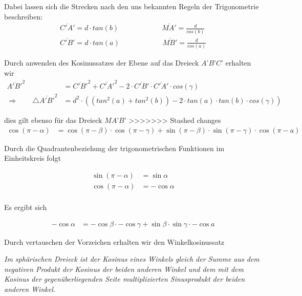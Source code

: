 \begin{refsection}
\begin{refsection}
Dabei lassen sich die Strecken nach den uns bekannten Regeln der Trigonometrie beschreiben:
\begin{align*}
\overline{C'A'} = d\cdot {tan(b)} \quad \quad \quad \quad \quad \quad 
\overline{MA'} = \frac{ d }{cos(b)} \\
\overline{C'B'} = d\cdot {tan(a)} \quad \quad \quad \quad \quad \quad 
\overline{MB'} = \frac{ d }{cos(a)}
\end{align*} 


Durch anwenden des Kosinussatzes der Ebene auf das Dreieck $A’B’C’$ erhalten wir
\begin{align}
\overline{A'B'}^{ 2 } &= \overline{ C'B' }^{ 2 } + \overline{ C'A' }^{ 2 } - 2 \cdot \overline{C'B'} \cdot \overline{ C'A' } \cdot cos(\gamma) \nonumber \\ 
\Rightarrow \quad \quad
\triangle \overline{A'B'}^{ 2 } &= d^{ 2 } \cdot \left(\left(tan^{ 2 }(a) + tan^{ 2 }(b)\right) - 2\cdot tan(a) \cdot tan(b) \cdot cos(\gamma)\right) 
\label {V3} 
\end{align}

dies gilt ebenso für das Dreieck $MA’B’$
>>>>>>> Stashed changes
\begin{align*}
{\cos (\pi-\alpha)} &= {\cos (\pi-\beta)} \cdot {\cos (\pi-\gamma)} + {\sin(\pi-\beta)} \cdot {\sin(\pi-\gamma)} \cdot {\cos (\pi-a)}
\end{align*}

Durch die Quadrantenbeziehung der trigonometrischen Funktionen im Einheitskreis folgt

\begin{align*}
\sin (\pi-\alpha) &= \sin \alpha\\
\cos (\pi-\alpha) &= - \cos \alpha\\
\end{align*}

Es ergibt sich

\begin{align*}
{-\cos \alpha} &= {-\cos \beta} \cdot {-\cos \gamma} + {\sin \beta} \cdot {\sin \gamma} \cdot {-\cos a}
\end{align*}

Durch vertauschen der Vorzeichen erhalten wir den Winkelkosinussatz

\begin{satz}\textit{Im sphärischen Dreieck ist der Kosinus eines Winkels gleich der Summe aus dem negativen Produkt der Kosinus der beiden anderen Winkel und dem mit dem Kosinus der gegenüberliegenden Seite multiplizierten Sinusprodukt der beiden anderen Winkel.}
\label{skript:kugel:satz:Winkelkosinussatz}
\end{satz}


\end{refsection}
\end{refsection}
